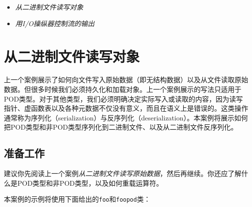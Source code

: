 
\begin{itemize}
\item \textit{从二进制文件读写对象}



\item \textit{用I/O操纵器控制流的输出}

\end{itemize}



\section{从二进制文件读写对象}



上一个案例展示了如何向文件写入原始数据（即无结构数据）以及从文件读取原始数据。但很多时候我们必须持久化和加载对象。上一个案例展示的写法只适用于POD类型。对于其他类型，我们必须明确决定实际写入或读取的内容，因为读写指针、虚函数表以及各种元数据不仅没有意义，而且在语义上是错误的。这类操作通常称为序列化（serialization）与反序列化（deserialization）。本案例将展示如何把POD类型和非POD类型序列化到二进制文件、以及从二进制文件反序列化。



\subsection{准备工作}



建议你先阅读上一个案例\textit{从二进制文件读写}\textit{原始数据}，然后再继续。你还应了解什么是POD类型和非POD类型，以及如何重载运算符。



本案例的示例将使用下面给出的\texttt{foo}和\texttt{foopod}类：



